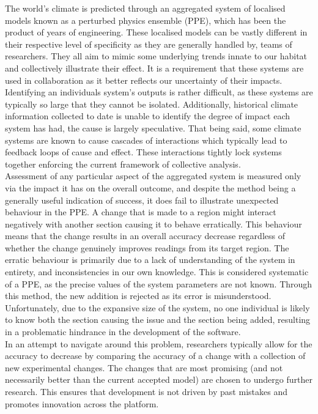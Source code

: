 \documentclass{ecmm427_assignment}
\begin{document}
\quad The world's climate is predicted through an aggregated system of localised models known as a perturbed physics ensemble (PPE), which has been the product of years of engineering. These localised models can be vastly different in their respective level of specificity as they are generally handled by,  teams of researchers. They all aim to mimic some underlying trends innate to our habitat and collectively illustrate their effect. It is a requirement that these systems are used in collaboration as it better reflects our uncertainty of their impacts. Identifying an individuals system's outputs is rather difficult, as these systems are typically so large that they cannot be isolated. Additionally, historical climate information collected to date is unable to identify the degree of impact each system has had, the cause is largely speculative. That being said, some climate systems are known to cause cascades of interactions which typically lead to feedback loops of cause and effect. These interactions tightly lock systems together enforcing the current framework of collective analysis.\\

\quad Assessment of any particular aspect of the aggregated system is measured only via the impact it has on the overall outcome, and despite the method being a generally useful indication of success, it does fail to illustrate unexpected behaviour in the PPE. A change that is made to a region might interact negatively with another section causing it to behave erratically. This behaviour means that the change results in an overall accuracy decrease regardless of whether the change genuinely improves readings from its target region. The erratic behaviour is primarily due to a lack of understanding of the system in entirety, and inconsistencies in our own knowledge. This is considered systematic of a PPE, as the precise values of the system parameters are not known. Through this method, the new addition is rejected as its error is misunderstood. Unfortunately, due to the expansive size of the system, no one individual is likely to know both the section causing the issue and the section being added, resulting in a problematic hindrance in the development of the software.\\

\quad In an attempt to navigate around this problem, researchers typically allow for the accuracy to decrease by comparing the accuracy of a change with a collection of new experimental changes. The changes that are most promising (and not necessarily better than the current accepted model) are chosen to undergo further research. This ensures that development is not driven by past mistakes and promotes innovation across the platform.\\
\end{document}
